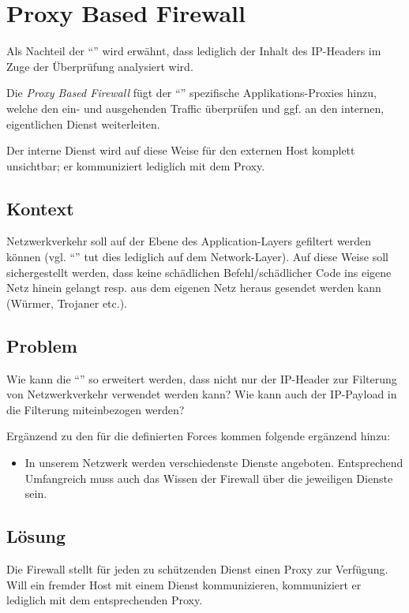 \section{Proxy Based Firewall}
\label{sec:proxy-based-firewall}

Als Nachteil der ``'' wird erwähnt, dass lediglich der Inhalt des IP-Headers im Zuge der Überprüfung analysiert wird.

Die \emph{Proxy Based Firewall} fügt der ``'' spezifische Applikations-Proxies hinzu, welche den ein- und ausgehenden Traffic überprüfen und ggf. an den internen, eigentlichen Dienst weiterleiten.

Der interne Dienst wird auf diese Weise für den externen Host  komplett unsichtbar; er kommuniziert lediglich mit dem Proxy.


\subsection*{Kontext}
Netzwerkverkehr soll auf der Ebene des Application-Layers gefiltert werden können (vgl. ``'' tut dies lediglich auf dem Network-Layer). Auf diese Weise soll sichergestellt werden, dass keine schädlichen Befehl/schädlicher Code ins eigene Netz hinein gelangt resp. aus dem eigenen Netz heraus gesendet werden kann (Würmer, Trojaner etc.).

\subsection*{Problem}
Wie kann die ``'' so erweitert werden, dass nicht nur der IP-Header zur Filterung von Netzwerkverkehr verwendet werden kann? Wie kann auch der IP-Payload in die Filterung miteinbezogen werden?

Ergänzend zu den für die  definierten Forces kommen folgende ergänzend hinzu:

\begin{itemize}
	\item In unserem Netzwerk werden verschiedenste Dienste angeboten. Entsprechend Umfangreich muss auch das Wissen der Firewall über die jeweiligen Dienste sein.
\end{itemize}


\subsection*{Lösung}
Die Firewall stellt für jeden zu schützenden Dienst einen Proxy zur Verfügung. Will ein fremder Host mit einem Dienst kommunizieren, kommuniziert er lediglich mit dem entsprechenden Proxy.

